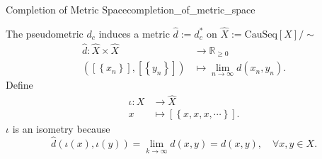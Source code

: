 \documentclass{report}
\begin{document}
\begin{definition}{Completion of Metric Space}{completion_of_metric_space}
\begin{enumerate}[(i)]
	\end{enumerate}
	The pseudometric $d_c$ induces a metric $\hat{d}:=d_c^*$ on $\widehat{X}:=\mathrm{CauSeq}[X]/\sim$
	\begin{align*}
		\hat{d}:\widehat{X}\times\widehat{X}&\longrightarrow\mathbb{R}_{\ge 0}\\
		\left([\left\{x_n\right\}],[\left\{y_n\right\}]\right)&\longmapsto\lim_{n\to\infty}d(x_n,y_n).
	\end{align*}
	Define 
	\begin{align*}
		\iota:X &\longrightarrow\widehat{X}\\
		x&\longmapsto[\left\{x,x,x,\cdots\right\}].
	\end{align*}
	$\iota$ is an isometry because
	\[
		\hat{d}\left(\iota\left(x\right),\iota\left(y\right)\right)=\lim_{k\to\infty}d(x,y)=d(x,y),\quad\forall x,y\in X.
	\]
\end{definition}
\end{document}
